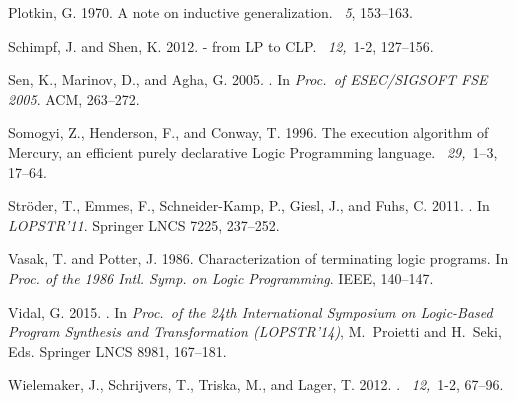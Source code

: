 \documentclass[fleqn]{tlp}
\begin{document}
\begin{thebibliography}{}
{\sc Plotkin, G.} 1970.
\newblock A note on inductive generalization.
~{\em 5}, 153--163.

{\sc Schimpf, J.} {\sc and} {\sc Shen, K.} 2012.
 - from {LP} to {CLP}.
~{\em 12,\/}~1-2,
  127--156.

{\sc Sen, K.}, {\sc Marinov, D.}, {\sc and} {\sc Agha, G.} 2005.
.
\newblock In {\em Proc.\ of ESEC/SIGSOFT FSE 2005}. ACM, 263--272.

{\sc Somogyi, Z.}, {\sc Henderson, F.}, {\sc and} {\sc Conway, T.} 1996.
\newblock The execution algorithm of {Mercury}, an efficient purely declarative
  {Logic Programming} language.
~{\em 29,\/}~1--3, 17--64.

{\sc Str{\"o}der, T.}, {\sc Emmes, F.}, {\sc Schneider-Kamp, P.}, {\sc Giesl,
  J.}, {\sc and} {\sc Fuhs, C.} 2011.
.
\newblock In {\em LOPSTR'11}. Springer LNCS 7225, 237--252.

{\sc Vasak, T.} {\sc and} {\sc Potter, J.} 1986.
\newblock Characterization of terminating logic programs.
\newblock In {\em Proc. of the 1986 Intl. Symp. on {Logic Programming}}. IEEE,
  140--147.

{\sc Vidal, G.} 2015.
.
\newblock In {\em Proc.\ of the 24th International Symposium on Logic-Based
  Program Synthesis and Transformation (LOPSTR'14)}, {M.~Proietti} {and}
  {H.~Seki}, Eds. Springer LNCS 8981, 167--181.

{\sc Wielemaker, J.}, {\sc Schrijvers, T.}, {\sc Triska, M.}, {\sc and} {\sc
  Lager, T.} 2012.
.
~{\em 12,\/}~1-2,
  67--96.

\end{thebibliography}
\end{document}
